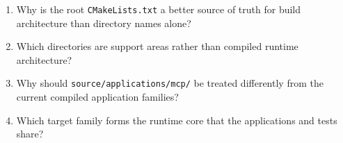 \begin{enumerate}
\item Why is the root \texttt{CMakeLists.txt} a better source of truth for build
architecture than directory names alone?
\item Which directories are support areas rather than compiled runtime
architecture?
\item Why should \texttt{source/applications/mcp/} be treated differently from
the current compiled application families?
\item Which target family forms the runtime core that the applications and tests
share?
\end{enumerate}
